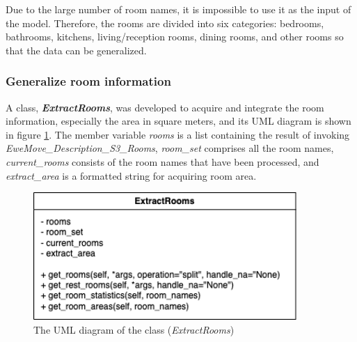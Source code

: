 \documentclass[12pt,twoside]{report}
\begin{document}
Due to the large number of room names, it is impossible to use it as the input of the model. Therefore, the rooms are divided into six categories: bedrooms, bathrooms, kitchens, living/reception rooms, dining rooms, and other rooms so that the data can be generalized. 
\\

\subsubsection{Generalize room information}
A class, \textit{\textbf{ExtractRooms}}, was developed to acquire and integrate the room information, especially the area in square meters, and its UML diagram is shown in figure \ref{uml_extract_rooms}. The member variable \textit{rooms} is a list containing the result of invoking \textit{EweMove\_Description\_S3\_Rooms}, \textit{room\_set} comprises all the room names, \textit{current\_rooms} consists of the room names that have been processed, and \textit{extract\_area} is a formatted string for acquiring room area. 
\\

\begin{figure}[h]
	\centering
	\includegraphics[width=10cm]{uml_extract_rooms}
	\caption{The UML diagram of the class (\textit{ExtractRooms})}
	\label{uml_extract_rooms}
\end{figure}
\end{document}
